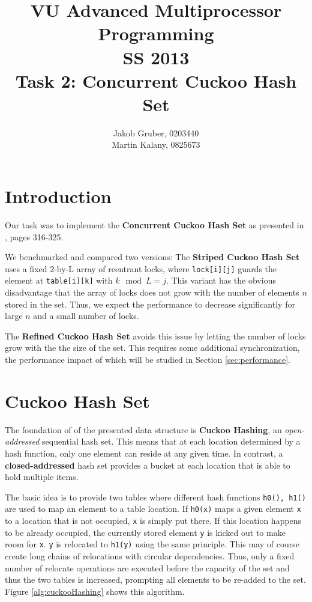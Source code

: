 \documentclass[a4paper,10pt]{article}
\title{VU Advanced Multiprocessor Programming \\
       SS 2013 \\
       Task 2: Concurrent Cuckoo Hash Set}
\author{Jakob Gruber, 0203440 \\
        Martin Kalany, 0825673}
\begin{document}
\maketitle

\begin{comment}
* Good theoretical analysis (invariants, linearizability, progress guarantees).
* Good benchmark analysis.
* Short document: 2-4 pages excluding plots and sourcecode. Description of data
  structure. Theoretical analysis. Benchmark (results, process).

+The Go implementation doesn't need either of these crutches. It's also designed
+to work without reentrant locks and thread ids.
\end{comment}

\section{Introduction}
Our task was to implement the \textbf{Concurrent Cuckoo Hash Set} as presented
in \cite{herlihy}, pages 316-325. 

We benchmarked and compared two versions: The \textbf{Striped Cuckoo Hash Set}
uses a fixed 2-by-L array of reentrant locks, where \lstinline|lock[i][j]|
guards the element at \lstinline|table[i][k]| with $k \mod L = j$. This variant
has the obvious disadvantage that the array of locks does not grow with the
number of elements $n$ stored in the set. Thus, we expect the performance to
decrease significantly for large $n$ and a small number of locks.

The \textbf{Refined Cuckoo Hash Set} avoids this issue by letting the number of
locks grow with the the size of the set. This requires some additional
synchronization, the performance impact of which will be studied in Section
\ref{sec:performance}.

\section{Cuckoo Hash Set}
The foundation of of the presented data structure is \textbf{Cuckoo Hashing},
an \textit{open-addressed} sequential hash set. This means that at each
location determined by a hash function, only one element can reside at any
given time. In contrast, a \textbf{closed-addressed} hash set provides a bucket
at each location that is able to hold multiple items.

The basic idea is to provide two tables where different hash functions
\lstinline|h0(), h1()| are used to map an element to a table location. If
\lstinline|h0(x)| maps a given element \lstinline|x| to a location that is not
occupied, \lstinline|x| is simply put there. If this location happens to be
already occupied, the currently stored element \lstinline|y| is kicked out to
make room for \lstinline|x|. \lstinline|y| is relocated to \lstinline|h1(y)|
using the same principle. This may of course create long chains of relocations
with circular dependencies. Thus, only a fixed number of relocate operations
are executed before the capacity of the set and thus the two tables is
increased, prompting all elements to be re-added to the set.
Figure \ref{alg:cuckooHashing} shows this algorithm.
\end{document}
